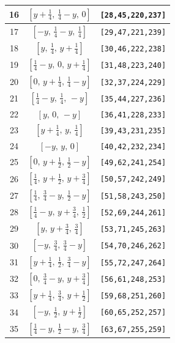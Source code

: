 \documentclass[fleqn,8pt]{jsarticle}
\begin{document}
\begin{longtable}{ccc}
16 & $\left[ y + \frac{1}{4},\, \frac{1}{4} - y,\, 0 \right]$ & {\tt [28,45,220,237]} \\ \hline
17 & $\left[ - y,\, \frac{1}{4} - y,\, \frac{1}{4} \right]$ & {\tt [29,47,221,239]} \\ \hline
18 & $\left[ y,\, \frac{1}{4},\, y + \frac{1}{4} \right]$ & {\tt [30,46,222,238]} \\ \hline
19 & $\left[ \frac{1}{4} - y,\, 0,\, y + \frac{1}{4} \right]$ & {\tt [31,48,223,240]} \\ \hline
20 & $\left[ 0,\, y + \frac{1}{4},\, \frac{1}{4} - y \right]$ & {\tt [32,37,224,229]} \\ \hline
21 & $\left[ \frac{1}{4} - y,\, \frac{1}{4},\, - y \right]$ & {\tt [35,44,227,236]} \\ \hline
22 & $\left[ y,\, 0,\, - y \right]$ & {\tt [36,41,228,233]} \\ \hline
23 & $\left[ y + \frac{1}{4},\, y,\, \frac{1}{4} \right]$ & {\tt [39,43,231,235]} \\ \hline
24 & $\left[ - y,\, y,\, 0 \right]$ & {\tt [40,42,232,234]} \\ \hline
25 & $\left[ 0,\, y + \frac{1}{2},\, \frac{1}{2} - y \right]$ & {\tt [49,62,241,254]} \\ \hline
26 & $\left[ \frac{1}{4},\, y + \frac{1}{2},\, y + \frac{3}{4} \right]$ & {\tt [50,57,242,249]} \\ \hline
27 & $\left[ \frac{1}{4},\, \frac{3}{4} - y,\, \frac{1}{2} - y \right]$ & {\tt [51,58,243,250]} \\ \hline
28 & $\left[ \frac{1}{4} - y,\, y + \frac{3}{4},\, \frac{1}{2} \right]$ & {\tt [52,69,244,261]} \\ \hline
29 & $\left[ y,\, y + \frac{3}{4},\, \frac{3}{4} \right]$ & {\tt [53,71,245,263]} \\ \hline
30 & $\left[ - y,\, \frac{3}{4},\, \frac{3}{4} - y \right]$ & {\tt [54,70,246,262]} \\ \hline
31 & $\left[ y + \frac{1}{4},\, \frac{1}{2},\, \frac{3}{4} - y \right]$ & {\tt [55,72,247,264]} \\ \hline
32 & $\left[ 0,\, \frac{3}{4} - y,\, y + \frac{3}{4} \right]$ & {\tt [56,61,248,253]} \\ \hline
33 & $\left[ y + \frac{1}{4},\, \frac{3}{4},\, y + \frac{1}{2} \right]$ & {\tt [59,68,251,260]} \\ \hline
34 & $\left[ - y,\, \frac{1}{2},\, y + \frac{1}{2} \right]$ & {\tt [60,65,252,257]} \\ \hline
35 & $\left[ \frac{1}{4} - y,\, \frac{1}{2} - y,\, \frac{3}{4} \right]$ & {\tt [63,67,255,259]} \\ \hline

\end{longtable}
\end{document}
